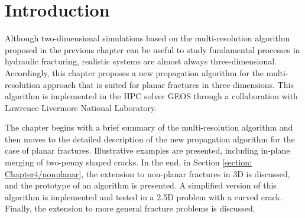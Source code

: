 \section{Introduction}
\label{section: Chapter4/intro}

Although two-dimensional simulations based on the multi-resolution algorithm proposed in the previous chapter can be useful to study fundamental processes in hydraulic fracturing, realistic systems are almost always three-dimensional. %
Accordingly, this chapter proposes a new propagation algorithm for the multi-resolution approach that is suited for planar fractures in three dimensions. This algorithm is implemented in the HPC solver GEOS \cite{settgast2012simulation,settgast2014simulation,settgast2017fully} through a collaboration with Lawrence Livermore National Laboratory. 

The chapter begins with a brief summary of the multi-resolution algorithm and then moves to the detailed description of the new propagation algorithm for the case of planar fractures. Illustrative examples are presented, including in-plane merging of two-penny shaped cracks. In the end, in Section \ref{section: Chapter4/nonplanar}, the extension to non-planar fractures in 3D is discussed, and the prototype of an algorithm is presented. A simplified version of this algorithm is implemented and tested in a 2.5D problem with a curved crack. Finally, the extension to more general fracture problems is discussed.  

